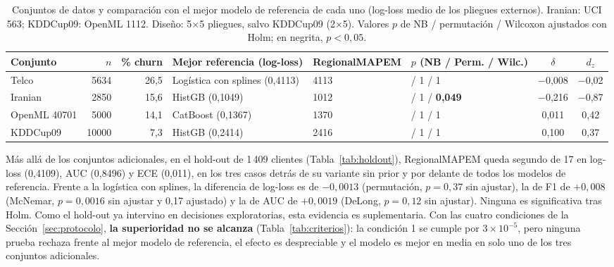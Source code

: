 \documentclass[11pt,a4paper]{article}
\begin{document}
\begin{table}[t]
\centering
\caption{Conjuntos de datos y comparación con el mejor modelo de referencia de cada uno (log-loss medio de los pliegues externos). Iranian: UCI 563; KDDCup09: OpenML 1112. Diseño: 5$\times$5 pliegues, salvo KDDCup09 (2$\times$5). Valores $p$ de NB / permutación / Wilcoxon ajustados con Holm; en negrita, $p<0{,}05$.}
\label{tab:conjuntos}
\footnotesize
\setlength{\tabcolsep}{3pt}
\begin{tabular}{lrr>{\raggedright\arraybackslash}p{2.3cm}>{\centering\arraybackslash}p{2.4cm}>{\centering\arraybackslash}p{2.0cm}cc}
\toprule
Conjunto & $n$ & \% churn & Mejor referencia (log-loss) & RegionalMAPEM & $p$ (NB / Perm. / Wilc.) & $\delta$ & $d_z$ \\
\midrule
Telco & 5634 & 26{,}5 & Logística con splines (0{,}4113) & 0{,}4113 & 1 / 1 / 1 & $-$0{,}008 & $-$0{,}02 \\
Iranian & 2850 & 15{,}6 & HistGB (0{,}1049) & 0{,}1012 & 1 / 1 / \textbf{0{,}049} & $-$0{,}216 & $-$0{,}87 \\
OpenML 40701 & 5000 & 14{,}1 & CatBoost (0{,}1367) & 0{,}1370 & 1 / 1 / 1 & 0{,}011 & 0{,}42 \\
KDDCup09 & 10000 & 7{,}3 & HistGB (0{,}2414) & 0{,}2416 & 1 / 1 / 1 & 0{,}100 & 0{,}37 \\
\bottomrule
\end{tabular}
\end{table}

Más allá de los conjuntos adicionales, en el hold-out de 1\,409 clientes (Tabla~\ref{tab:holdout}), RegionalMAPEM queda segundo de 17 en log-loss (0,4109), AUC (0,8496) y ECE (0,011), en los tres casos detrás de su variante sin prior y por delante de todos los modelos de referencia. Frente a la logística con splines, la diferencia de log-loss es de $-0{,}0013$ (permutación, $p=0{,}37$ sin ajustar), la de F1 de $+0{,}008$ (McNemar, $p=0{,}0016$ sin ajustar y 0,17 ajustado) y la de AUC de $+0{,}0019$ (DeLong, $p=0{,}12$ sin ajustar). Ninguna es significativa tras Holm. Como el hold-out ya intervino en decisiones exploratorias, esta evidencia es suplementaria. Con las cuatro condiciones de la Sección~\ref{sec:protocolo}, \textbf{la superioridad no se alcanza} (Tabla~\ref{tab:criterios}): la condición 1 se cumple por $3\times10^{-5}$, pero ninguna prueba rechaza frente al mejor modelo de referencia, el efecto es despreciable y el modelo es mejor en media en solo uno de los tres conjuntos adicionales.
\end{document}
